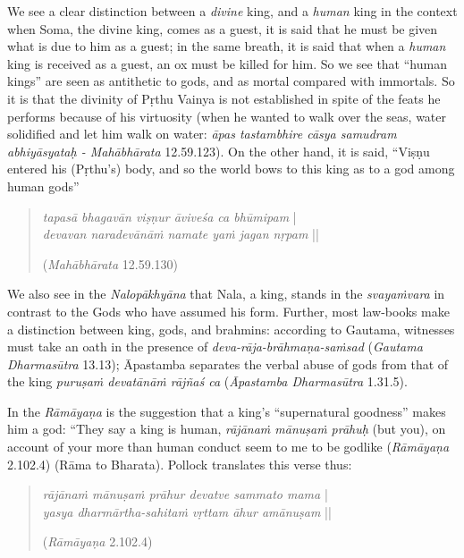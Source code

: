 We see a clear distinction between a {\sl divine} king, and a {\sl human} king in the context when Soma, the divine king, comes as a guest, it is said that he must be given what is due to him as a guest; in the same breath, it is said that when a {\sl human} king is received as a guest, an ox must be killed for him.  So we see that “human kings” are seen as antithetic to gods, and as mortal compared with immortals. So it is that the divinity of Pṛthu Vainya is not established in spite of the feats he performs because of his virtuosity (when he wanted to walk over the seas, water solidified and let him walk on water: {\sl āpas tastambhire cāsya samudram abhiyāsyataḥ - Mahābhārata} 12.59.123). On the other hand, it is said, “Viṣṇu entered his (Pṛthu’s) body, and so the world bows to this king as to a god among human gods” 
\begin{quote}
{\sl tapasā bhagavān viṣṇur āviveśa ca bhūmipam} |\\ 
{\sl devavan naradevānāṁ namate yaṁ jagan nṛpam} || 

\hfill ({\sl Mahābhārata} 12.59.130)
\end{quote}

We also see in the {\sl Nalopākhyāna} that Nala, a king, stands in the {\sl svayaṁvara} in contrast to the Gods who have assumed his form. Further, most law-books make a distinction between king, gods, and brahmins: according to Gautama, witnesses must take an oath in the presence of {\sl deva-rāja-brāhmaṇa-saṁsad} ({\sl Gautama Dharmasūtra} 13.13); Āpastamba separates the verbal abuse of gods from that of the king {\sl puruṣaṁ devatānāṁ rājñaś ca} ({\sl Āpastamba Dharmasūtra} 1.31.5). 

In the {\sl Rāmāyaṇa} is the suggestion that a king’s “supernatural goodness” makes him a god: “They say a king is human, {\sl rājānaṁ mānuṣaṁ prāhuḥ} (but you), on account of your more than human conduct seem to me to be godlike ({\sl Rāmāyaṇa} 2.102.4) (Rāma to Bharata). Pollock translates this verse thus:  
\begin{quote}
{{\sl rājānaṁ mānuṣaṁ prāhur devatve sammato mama}} |\\
{\sl yasya dharmārtha-sahitaṁ vṛttam āhur amānuṣam} || 

\hfill ({\sl Rāmāyaṇa} 2.102.4)
\end{quote}

